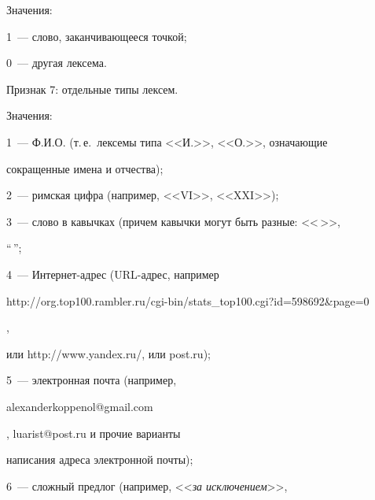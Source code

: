    


   Значения: 


   


   1~---   слово, заканчивающееся точкой; 


   


   0~---  другая лексема.


   


   \smallskip


   


   Признак 7: отдельные типы лексем. 


   


   Значения: 


   


   1~---  Ф.И.О. (т.\,е.\ лексемы типа <<И.>>, <<О.>>, означающие 


сокращенные имена и отчества); 


   


 2~---  римская цифра (например, <<VI>>, <<XXI>>);  


   


   3~---   слово в кавычках (причем кавычки могут быть разные: <<\,>>, 


``\,''; 





   4~---  Интернет-адрес (URL-адрес, например {\sf 


http://org.top100.rambler.ru/\linebreak cgi-bin/stats\_top100.cgi?id=598692\&page=0}, 


или {\sf http://www.yandex.ru/}, или {\sf post.ru});


   


   5~---  электронная почта (например, {\sf 


alexanderkoppenol@gmail.com}, {\sf  luarist@\linebreak post.ru}  и прочие варианты 


написания адреса электронной почты);


   


   6~---  сложный предлог (например, <<\textit{за исключением}>>, 


